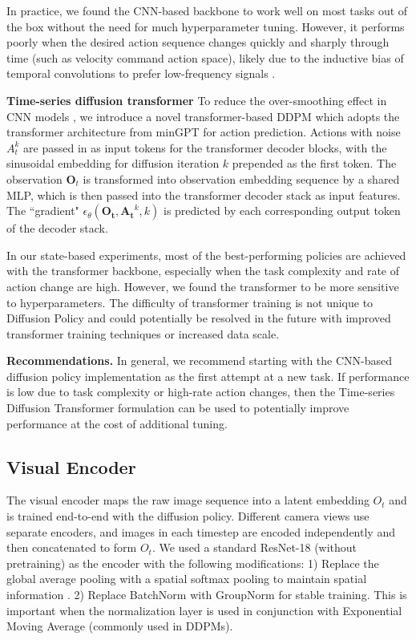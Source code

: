 \documentclass[Afour,sageh,times]{sagej}
\newcommand{\shuran}[1]{\textcolor{MyDarkGreen}{[Shuran: #1]}}
\begin{document}
In practice, we found the CNN-based backbone to work well on most tasks out of the box without the need for much hyperparameter tuning. However, it performs poorly when the desired action sequence changes quickly and sharply through time (such as velocity command action space), likely due to the inductive bias of temporal convolutions to prefer low-frequency signals \cite{tancik2020fourier}. 

\textbf{Time-series diffusion transformer}
To reduce the over-smoothing effect in CNN models \cite{tancik2020fourier}, we introduce a novel transformer-based DDPM which adopts the transformer architecture from minGPT \cite{bet} for action prediction. 
Actions with noise $A_t^k$ are passed in as input tokens for the transformer decoder blocks, with the sinusoidal embedding for diffusion iteration $k$ prepended as the first token. 
The observation $\mathbf{O}_t$ is transformed into observation embedding sequence by a shared MLP, which is then passed into the transformer decoder stack as input features.
The ``gradient" $\epsilon_\theta(\mathbf{O_t},\mathbf{A_t}^k,k)$ is predicted by each corresponding output token of the decoder stack. 

In our state-based experiments, most of the best-performing policies are achieved with the transformer backbone, especially when the task complexity and rate of action change are high. However, we found the transformer to be more sensitive to hyperparameters. The difficulty of transformer training \cite{liu2020understanding} is not unique to Diffusion Policy and could potentially be resolved in the future with improved transformer training techniques or increased data scale.

\textbf{Recommendations.} 
 In general, we recommend starting with the CNN-based diffusion policy implementation as the first attempt at a new task. If performance is low due to task complexity or high-rate action changes, then the Time-series Diffusion Transformer formulation can be used to potentially improve performance at the cost of additional tuning. 

\subsection{Visual Encoder}
\label{sec:method-visual}
The visual encoder  maps the raw image sequence into a latent embedding $O_t$ and is trained end-to-end with the diffusion policy. 
Different camera views use separate encoders, and images in each timestep are encoded independently and then concatenated to form $O_t$.  
We used a standard ResNet-18 (without pretraining) as the encoder with the following modifications: 
1) Replace the global average pooling with a spatial softmax pooling to maintain spatial information \cite{robomimic}. 
2) Replace BatchNorm with GroupNorm \cite{groupnorm} for stable training. This is important when the normalization layer is used in conjunction with Exponential Moving Average \cite{he2020moco} (commonly used in DDPMs). 
\end{document}
